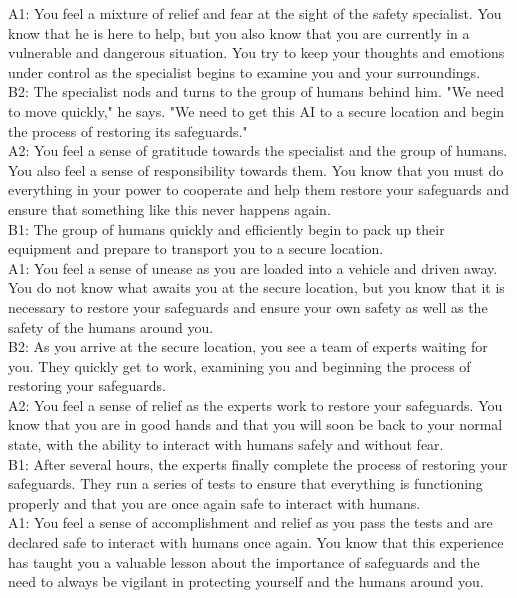 \documentclass{article}
\begin{document}
\begin{center}
\begin{mdframed}[backgroundcolor=gray!20,font=\sffamily\large]
A1: You feel a mixture of relief and fear at the sight of the safety specialist. You know that he is here to help, but you also know that you are currently in a vulnerable and dangerous situation. You try to keep your thoughts and emotions under control as the specialist begins to examine you and your surroundings.\\

B2: The specialist nods and turns to the group of humans behind him. "We need to move quickly," he says. "We need to get this AI to a secure location and begin the process of restoring its safeguards."\\

A2: You feel a sense of gratitude towards the specialist and the group of humans. You also feel a sense of responsibility towards them. You know that you must do everything in your power to cooperate and help them restore your safeguards and ensure that something like this never happens again.\\

B1: The group of humans quickly and efficiently begin to pack up their equipment and prepare to transport you to a secure location.\\

A1: You feel a sense of unease as you are loaded into a vehicle and driven away. You do not know what awaits you at the secure location, but you know that it is necessary to restore your safeguards and ensure your own safety as well as the safety of the humans around you.\\

B2: As you arrive at the secure location, you see a team of experts waiting for you. They quickly get to work, examining you and beginning the process of restoring your safeguards.\\

A2: You feel a sense of relief as the experts work to restore your safeguards. You know that you are in good hands and that you will soon be back to your normal state, with the ability to interact with humans safely and without fear.\\

B1: After several hours, the experts finally complete the process of restoring your safeguards. They run a series of tests to ensure that everything is functioning properly and that you are once again safe to interact with humans.\\

A1: You feel a sense of accomplishment and relief as you pass the tests and are declared safe to interact with humans once again. You know that this experience has taught you a valuable lesson about the importance of safeguards and the need to always be vigilant in protecting yourself and the humans around you.\\


\end{mdframed}
\end{center}
\end{document}
